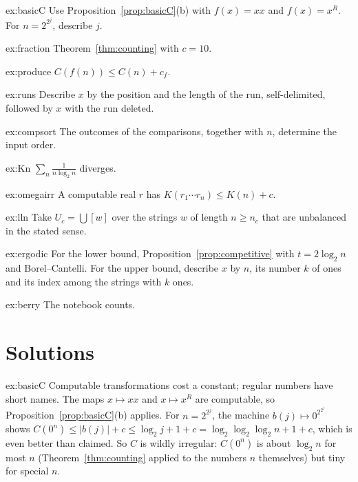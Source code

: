 \begin{hint}{ex:basicC}
Use Proposition~\ref{prop:basicC}(b) with $f(x)=xx$ and $f(x)=x^R$. For $n=2^{2^j}$, describe $j$.
\end{hint}
\begin{hint}{ex:fraction}
Theorem~\ref{thm:counting} with $c=10$.
\end{hint}
\begin{hint}{ex:produce}
$C(f(n))\le C(n)+c_f$.
\end{hint}
\begin{hint}{ex:runs}
Describe $x$ by the position and the length of the run, self-delimited, followed by $x$ with the run deleted.
\end{hint}
\begin{hint}{ex:compsort}
The outcomes of the comparisons, together with $n$, determine the input order.
\end{hint}
\begin{hint}{ex:Kn}
$\sum_n\frac1{n\log_2n}$ diverges.
\end{hint}
\begin{hint}{ex:omegairr}
A computable real $r$ has $K(r_1\cdots r_n)\le K(n)+c$.
\end{hint}
\begin{hint}{ex:lln}
Take $U_c=\bigcup[w]$ over the strings $w$ of length $n\ge n_c$ that are unbalanced in the stated sense.
\end{hint}
\begin{hint}{ex:ergodic}
For the lower bound, Proposition~\ref{prop:competitive} with $t=2\log_2n$ and Borel--Cantelli. For the upper bound, describe $x$ by $n$, its number $k$ of ones and its index among the strings with $k$ ones.
\end{hint}
\begin{hint}{ex:berry}
The notebook counts.
\end{hint}

\section{Solutions}

\begin{solution}{ex:basicC}
\idea Computable transformations cost a constant; regular numbers have short names.
\writeup The maps $x\mapsto xx$ and $x\mapsto x^R$ are computable, so Proposition~\ref{prop:basicC}(b) applies. For $n=2^{2^j}$, the machine $b(j)\mapsto0^{2^{2^j}}$ shows $C(0^n)\le|b(j)|+c\le\log_2j+1+c=\log_2\log_2\log_2n+1+c$, which is even better than claimed. So $C$ is wildly irregular: $C(0^n)$ is about $\log_2n$ for most $n$ (Theorem~\ref{thm:counting} applied to the numbers $n$ themselves) but tiny for special $n$.
\end{solution}

